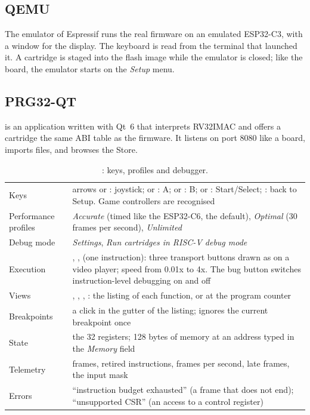 \subsection{QEMU}

The emulator of Espressif runs the real firmware on an emulated ESP32-C3,
with a window for the display. The keyboard is read from the terminal that
launched it. A cartridge is staged into the flash image while the emulator
is closed; like the board, the emulator starts on the \emph{Setup} menu.

\subsection{PRG32-QT}

\prgqt is an application written with Qt~6 that interprets RV32IMAC and
offers a cartridge the same ABI table as the firmware. It listens on port
8080 like a board, imports  files, and browses the Store.

\begin{table}[htb]
\centering\small
\caption{\prgqt: keys, profiles and debugger.}\label{tab:prg:qt}
\begin{tabularx}{\textwidth}{@{}P{0.26\textwidth}L@{}}
\toprule
Keys & arrows or : joystick;  or : A;  or : B;  or : Start/Select; : back to Setup. Game controllers are recognised\\
Performance profiles & \emph{Accurate} (timed like the ESP32-C6, the default), \emph{Optimal} (30 frames per second), \emph{Unlimited}\\
Debug mode & \emph{Settings}, \emph{Run cartridges in RISC-V debug mode}\\
Execution & , ,  (one instruction): three transport buttons drawn as on a video player; speed from 0.01x to 4x. The bug button switches instruction-level debugging on and off\\
Views & , , , : the listing of each function, or at the program counter\\
Breakpoints & a click in the gutter of the listing;  ignores the current breakpoint once\\
State & the 32 registers; 128 bytes of memory at an address typed in the \emph{Memory} field\\
Telemetry & frames, retired instructions, frames per second, late frames, the input mask\\
Errors & ``instruction budget exhausted'' (a frame that does not end); ``unsupported CSR'' (an access to a control register)\\
\bottomrule
\end{tabularx}
\end{table}

